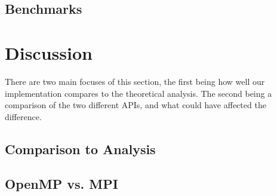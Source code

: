 \documentclass[a4paper]{article}
\begin{document}
\subsection{Benchmarks}

\section{Discussion}
There are two main focuses of this section, the first being how well our implementation compares to the theoretical analysis. The second being a comparison of the two different APIs, and what could have affected the difference.
\subsection{Comparison to Analysis}

\subsection{OpenMP vs. MPI}

\end{document}
